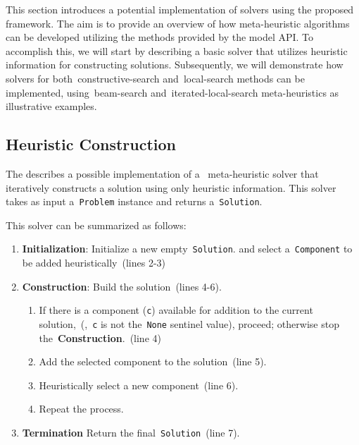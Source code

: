 This section introduces a potential implementation of solvers using the proposed
framework. The aim is to provide an overview of how meta-heuristic algorithms
can be developed utilizing the methods provided by the model API. To accomplish
this, we will start by describing a basic solver that utilizes heuristic
information for constructing solutions. Subsequently, we will demonstrate how
solvers for both~\acrshort{constructive-search} and~\acrshort{local-search}
methods can be implemented, using~\acrshort{beam-search}
and~\acrshort{iterated-local-search} meta-heuristics as illustrative examples.

\subsection{Heuristic Construction}
\label{subsec:heuristic-construction}

The  describes a possible implementation of a
~\acrshort{meta-heuristic} solver that iteratively constructs a solution using
only heuristic information. This solver takes as input a~\texttt{Problem}
instance and returns a~\texttt{Solution}.



This solver can be summarized as follows:

\begin{enumerate}
      \item \textbf{Initialization}: Initialize a new empty~\texttt{Solution}.
            and select a~\texttt{Component} to be added heuristically~(lines 2-3)
      \item \textbf{Construction}: Build the solution~(lines 4-6).
            \begin{enumerate}
                  \item If there is a component (\texttt{c}) available for addition to the
                        current solution,~(\ie{},~\texttt{c} is not the~\texttt{None}
                        sentinel value), proceed; otherwise stop the~\textbf{Construction}.~(line 4)
                  \item Add the selected component to the solution~(line 5).
                  \item Heuristically select a new component~(line 6).
                  \item Repeat the process.
            \end{enumerate}
      \item \textbf{Termination} Return the final~\texttt{Solution}~(line 7).
\end{enumerate}

